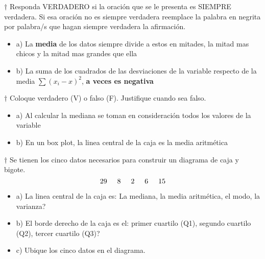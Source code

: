\documentclass[10pt,a4paper]{article}
\begin{document}
$\dagger$ Responda VERDADERO si la oración que se le presenta es SIEMPRE verdadera. Si esa oración no es siempre verdadera reemplace la palabra en negrita por palabra/s que hagan siempre verdadera la afirmación.

\begin{itemize}
	\item a) La \textbf{media} de los datos siempre divide a estos en mitades, la mitad mas chicos y la mitad mas grandes que ella
	\item b) La suma de los cuadrados de las desviaciones de la variable respecto de la media $\sum (x_i-x)^2$, \textbf{a veces es negativa}
\end{itemize}

$\dagger$ Coloque verdadero (V) o falso (F). Justifique cuando sea falso.
\begin{itemize}
	\item a) Al calcular la mediana se toman en consideración todos los valores de la variable
	\item b) En un box plot, la linea central de la caja es la media aritmética
\end{itemize}

$\dagger$ Se tienen los cinco datos necesarios para construir un diagrama de caja y bigote.
\begin{equation*}
	29 \hspace{5mm} 8 \hspace{5mm} 2 \hspace{5mm} 6 \hspace{5mm} 15
\end{equation*}

\begin{itemize}
	\item a) La linea central de la caja es: La mediana, la media aritmética, el modo, la varianza?
	\item b) El borde derecho de la caja es el: primer cuartilo (Q1), segundo cuartilo (Q2), tercer cuartilo (Q3)?
	\item c) Ubique los cinco datos en el diagrama.	
\end{itemize}

\begin{center}
\end{center}
\end{document}
